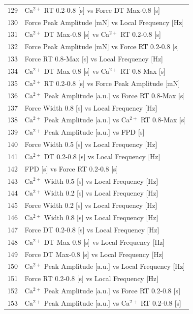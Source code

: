 \documentclass{report}
\begin{document}
\begin{tabular}{@{}ll@{}}
129 & Ca$^{2+}$ RT 0.2-0.8 [s] vs Force DT Max-0.8 [s] \\
130 & Force Peak Amplitude [mN] vs Local Frequency [Hz] \\
131 & Ca$^{2+}$ DT Max-0.8 [s] vs Ca$^{2+}$ RT 0.2-0.8 [s] \\
132 & Force Peak Amplitude [mN] vs Force RT 0.2-0.8 [s] \\
133 & Force RT 0.8-Max [s] vs Local Frequency [Hz] \\
134 & Ca$^{2+}$ DT Max-0.8 [s] vs Ca$^{2+}$ RT 0.8-Max [s] \\
135 & Ca$^{2+}$ RT 0.2-0.8 [s] vs Force Peak Amplitude [mN] \\
136 & Ca$^{2+}$ Peak Amplitude [a.u.] vs Force RT 0.8-Max [s] \\
137 & Force Width 0.8 [s] vs Local Frequency [Hz] \\
138 & Ca$^{2+}$ Peak Amplitude [a.u.] vs Ca$^{2+}$ RT 0.8-Max [s] \\
139 & Ca$^{2+}$ Peak Amplitude [a.u.] vs FPD [s] \\
140 & Force Width 0.5 [s] vs Local Frequency [Hz] \\
141 & Ca$^{2+}$ DT 0.2-0.8 [s] vs Local Frequency [Hz] \\
142 & FPD [s] vs Force RT 0.2-0.8 [s] \\
143 & Ca$^{2+}$ Width 0.5 [s] vs Local Frequency [Hz] \\
144 & Ca$^{2+}$ Width 0.2 [s] vs Local Frequency [Hz] \\
145 & Force Width 0.2 [s] vs Local Frequency [Hz] \\
146 & Ca$^{2+}$ Width 0.8 [s] vs Local Frequency [Hz] \\
147 & Force DT 0.2-0.8 [s] vs Local Frequency [Hz] \\
148 & Ca$^{2+}$ DT Max-0.8 [s] vs Local Frequency [Hz] \\
149 & Force DT Max-0.8 [s] vs Local Frequency [Hz] \\
150 & Ca$^{2+}$ Peak Amplitude [a.u.] vs Local Frequency [Hz] \\
151 & Force RT 0.2-0.8 [s] vs Local Frequency [Hz] \\
152 & Ca$^{2+}$ Peak Amplitude [a.u.] vs Force RT 0.2-0.8 [s] \\
153 & Ca$^{2+}$ Peak Amplitude [a.u.] vs Ca$^{2+}$ RT 0.2-0.8 [s] \\
\bottomrule
\end{tabular}
\end{document}
